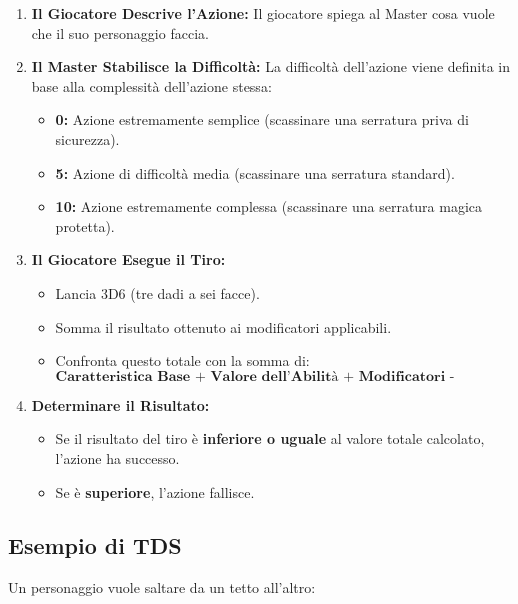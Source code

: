 \documentclass[../manuale_main.tex]{subfiles}
\begin{document}
\begin{enumerate}
    \item \textbf{Il Giocatore Descrive l'Azione:} Il giocatore spiega al Master cosa vuole che il suo personaggio faccia.
    
    \item \textbf{Il Master Stabilisce la Difficoltà:} La difficoltà dell'azione viene definita in base alla complessità dell'azione stessa:
    \begin{itemize}
        \item \textbf{0:} Azione estremamente semplice (scassinare una serratura priva di sicurezza).
        \item \textbf{5:} Azione di difficoltà media (scassinare una serratura standard).
        \item \textbf{10:} Azione estremamente complessa (scassinare una serratura magica protetta).
    \end{itemize}
    
    \item \textbf{Il Giocatore Esegue il Tiro:} 
    \begin{itemize}
        \item Lancia 3D6 (tre dadi a sei facce).
        \item Somma il risultato ottenuto ai modificatori applicabili.
        \item Confronta questo totale con la somma di:
        \[
        \textbf{Caratteristica Base + Valore dell’Abilità + Modificatori - Difficoltà}
        \]
    \end{itemize}
    
    \item \textbf{Determinare il Risultato:} 
    \begin{itemize}
        \item Se il risultato del tiro è \textbf{inferiore o uguale} al valore totale calcolato, l'azione ha successo.
        \item Se è \textbf{superiore}, l'azione fallisce.
    \end{itemize}
\end{enumerate}

\vspace{0.3cm}

\subsection{Esempio di TDS}
Un personaggio vuole saltare da un tetto all'altro:
\end{document}
